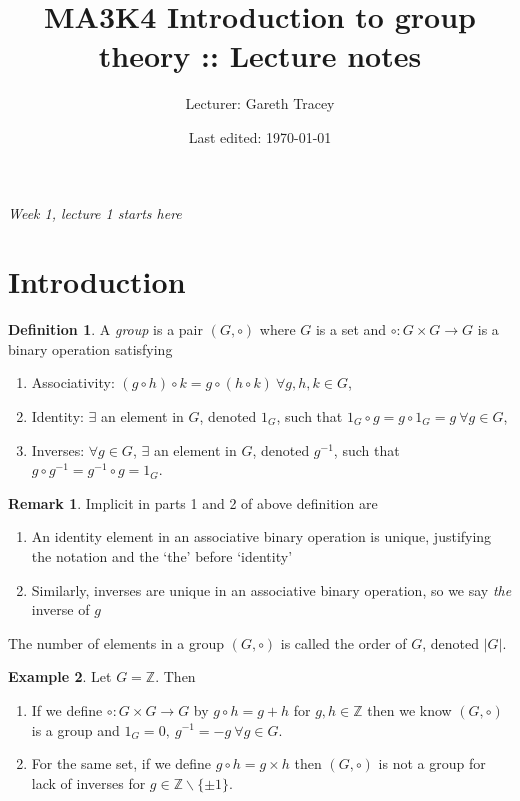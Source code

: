 \documentclass[a4paper]{article}
\title{MA3K4 Introduction to group theory :: Lecture notes}
\author{Lecturer: Gareth Tracey}
\date{Last edited: \today}
\newcommand{\Z}{\mathbb{Z}}
\theoremstyle{definition}
\newtheorem{defn}{Definition}[subsection]
\newtheorem{example}[defn]{Example}
\newtheorem*{remark}{Remark}
\begin{document}
\maketitle
\thispagestyle{empty}

\tableofcontents
\thispagestyle{empty}
\newpage
\setcounter{page}{1}

\begin{flushright}
\textit{Week 1, lecture 1 starts here}
\end{flushright}

\section{Introduction}
\begin{defn}
A \textit{group} is a pair $(G,\circ)$ where $G$ is a set and $\circ:G\times G\rightarrow G$ is a binary operation satisfying
\begin{enumerate}
\item Associativity: $(g\circ h)\circ k = g\circ (h\circ k) \ \forall g,h,k \in G$,
\item Identity: $\exists$ an element in $G$, denoted $1_G$, such that $1_G\circ g = g\circ 1_G = g \ \forall g\in G$,
\item Inverses: $\forall g\in G$, $\exists$ an element in $G$, denoted $g^{-1}$, such that $g\circ g^{-1} = g^{-1}\circ g = 1_G$.
\end{enumerate}
\end{defn}

\begin{remark}
Implicit in parts 1 and 2 of above definition are
\begin{enumerate}
\item An identity element in an associative binary operation is unique, justifying the notation and the `the' before `identity'
\item Similarly, inverses are unique in an associative binary operation, so we say \textit{the} inverse of $g$
\end{enumerate}
The number of elements in a group $(G,\circ)$ is called the order of $G$, denoted $|G|$.
\end{remark}

\begin{example}
Let $G=\Z$. Then
\begin{enumerate}
\item If we define $\circ:G\times G\rightarrow G$ by $g\circ h=g+h$ for $g,h\in \Z$ then we know $(G,\circ)$ is a group and $1_G=0,\ g^{-1}=-g \ \forall g\in G$.
\item For the same set, if we define $g\circ h=g\times h$ then $(G,\circ)$ is not a group for lack of inverses for $g\in \Z \backslash \{\pm 1\}$.
\end{enumerate}
\end{example}
\end{document}
